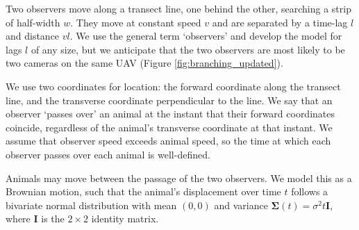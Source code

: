 \documentclass[useAMS, usenatbib, referee]{biom}\usepackage[]{graphicx}\usepackage[]{color}
\begin{document}

Two observers move along a transect line, one behind the other, searching a strip of half-width $w$. They move at constant speed $v$ and are separated by a time-lag $l$ and distance $vl$. We use the general term `observers' and develop the model for lags $l$ of any size, but we anticipate that the two observers are most likely to be two cameras on the same UAV (Figure \ref{fig:branching_updated}).

We use two coordinates for location: the forward coordinate along the transect line, and the transverse coordinate perpendicular to the line. We say that an observer `passes over' an animal at the instant that their forward coordinates coincide, regardless of the animal's transverse coordinate at that instant. We assume that observer speed exceeds animal speed, so the time at which each observer passes over each animal is well-defined.

Animals may move between the passage of the two observers. We model this as a Brownian motion, such that the animal's displacement over time $t$ follows a bivariate normal distribution with mean $(0,0)$ and variance $\bm{\Sigma}(t)=\sigma^2t\bm{I}$, where $\bm{I}$ is the $2\times 2$ identity matrix.
\end{document}
